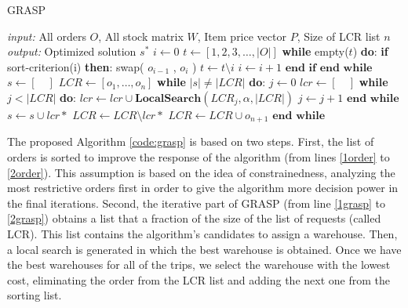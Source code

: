 \documentclass[letterpaper]{article} %
\begin{document}
\begin{algorithm}[H]
    \caption{GRASP}
    \label{alg:GRASP}
    \begin{algorithmic}[1] \label{code:grasp}
        \STATE \textit{input: } All orders $O$, All stock matrix $W$, Item price vector $P$, Size of LCR list $n$
        \STATE \textit{output: } Optimized solution $s^*$
        \STATE $i \longleftarrow 0 $
        \STATE $ t \longleftarrow [1,2,3,\dots,|O|]$
        \STATE \textbf{while} empty($t$) \textbf{do}: \label{1order}
        \STATE \quad \textbf{if} sort-criterion(i) \textbf{then}: \label{sort-criterion}
        \STATE \quad \quad swap( $ o_{i-1}$ , $ o_{i} $ )
        \STATE \quad \quad $t \longleftarrow t \setminus i$
        \STATE \quad \quad $i \longleftarrow i + 1$
        \STATE \quad $\textbf{end if}$
        \STATE $\textbf{end while}$ \label{2order}
        \STATE
        \STATE $s \longleftarrow [\quad] $
        \STATE $LCR \longleftarrow [o_1,\dots,o_n]$
        \STATE \textbf{while } $|s| \neq |LCR|$ \textbf{do}:\label{1grasp}
        \STATE \quad $j \longleftarrow 0 $
        \STATE \quad $lcr \longleftarrow [\quad]$
        \STATE \quad \textbf{while } $j < |LCR|$ \textbf{do}:
        \STATE \quad \quad $lcr \longleftarrow lcr \cup \textbf{LocalSearch}(LCR_j,\alpha,|LCR|)$
        \STATE \quad \quad $j \longleftarrow j + 1$
        \STATE \quad $\textbf{end while}$
        \STATE \quad $s \longleftarrow s \cup lcr*$ 
        \STATE \quad $LCR \longleftarrow LCR \setminus lcr*$ 
        \STATE \quad $LCR \longleftarrow LCR \cup  o_{n+1} $ 
        \STATE $\textbf{end while}$\label{2grasp}
    \end{algorithmic}
\end{algorithm}


The proposed Algorithm \ref{code:grasp} is based on two steps. First, the list of orders is sorted to improve the response of the algorithm (from lines \ref{1order} to \ref{2order}). This assumption is based on the idea of constrainedness, analyzing the most restrictive orders first in order to give the algorithm more decision power in the final iterations. Second, the iterative part of GRASP (from line \ref{1grasp} to \ref{2grasp}) obtains a list that a fraction of the size of the list of requests (called LCR). This list contains the algorithm's candidates to assign a warehouse. Then, a local search is generated in which the best warehouse is obtained. Once we have the best warehouses for all of the trips, we select the warehouse with the lowest cost, eliminating the order from the LCR list and adding the next one from the sorting list.
\end{document}
